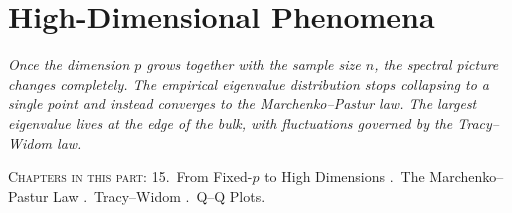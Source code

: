 \part{High-Dimensional Phenomena}

\begin{fullwidth}
\noindent\textit{Once the dimension $p$ grows together with the sample size $n$, the spectral picture changes completely. The empirical eigenvalue distribution stops collapsing to a single point and instead converges to the \emph{Marchenko--Pastur} law. The largest eigenvalue lives at the edge of the bulk, with fluctuations governed by the \emph{Tracy--Widom} law.}

\medskip
\noindent\textsc{Chapters in this part:} 15.~From Fixed-$p$ to High Dimensions .~The Marchenko--Pastur Law .~Tracy--Widom .~Q--Q Plots.
\end{fullwidth}
